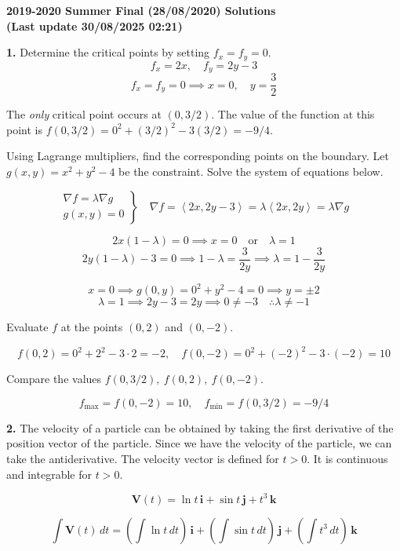 \documentclass{article}
\begin{document}
\newpage

\begin{center}
\textbf{2019-2020 Summer Final (28/08/2020) Solutions\\
(Last update 30/08/2025 02:21)}
\end{center}

\textbf{1.} Determine the critical points by setting $f_x=f_y=0$.
\[f_x=2x,\quad f_y=2y-3\]
\[f_x=f_y=0\implies x=0,\quad y=\frac32\]

The \textit{only} critical point occurs at $(0,3/2)$. The value of the function at this point is $f(0, 3/2) = 0^2 + (3/2)^2 -3(3/2)=-9/4$.

Using Lagrange multipliers, find the corresponding points on the boundary. Let $g(x,y)=x^2+y^2-4$ be the constraint. Solve the system of equations below.

\[
\left.
\begin{array}{ll}
\displaystyle\nabla f =\lambda \nabla g\\
\displaystyle g(x,y) = 0
\end{array}
\right\}\quad
\nabla f = \left\langle2x,2y-3\right\rangle=\lambda\left\langle2x,2y\right\rangle= \lambda\nabla g
\]

\[2x(1-\lambda)=0\implies x=0\quad\text{or}\quad\lambda=1\]
\[2y(1-\lambda)-3=0\implies1-\lambda=\frac3{2y}\implies\lambda=1-\frac3{2y}\]

\[x=0\implies g(0,y)=0^2+y^2-4=0\implies y=\pm2\]
\[\lambda=1\implies 2y-3=2y\implies 0\neq-3\quad\therefore\lambda\neq-1\]

Evaluate $f$ at the points $(0,2)$ and $(0,-2)$.

\[f(0,2)=0^2+2^2-3\cdot2=-2,\quad f(0,-2)=0^2+(-2)^2-3\cdot(-2)=10\]

Compare the values $f(0,3/2),\:f(0,2),\:f(0,-2)$.

\[\boxed{f_{\text{max}}=f(0,-2)=10,\quad f_{\text{min}}=f(0,3/2)=-9/4}\]

\vspace{1em}

\textbf{2.} The velocity of a particle can be obtained by taking the first derivative of the position vector of the particle. Since we have the velocity of the particle, we can take the antiderivative. The velocity vector is defined for $t>0$. It is continuous and integrable for $t>0$.

\[\mathbf{V}(t)=\ln t\,\mathbf{i}+\sin t\,\mathbf{j}+t^3\,\mathbf{k}\]

\[\int\mathbf{V}(t)\,dt=\left(\int\ln t\,dt\right)\,\mathbf{i}+\left(\int\sin t\,dt\right)\,\mathbf{j}+\left(\int t^3\,dt\right)\,\mathbf{k}\]
\end{document}

